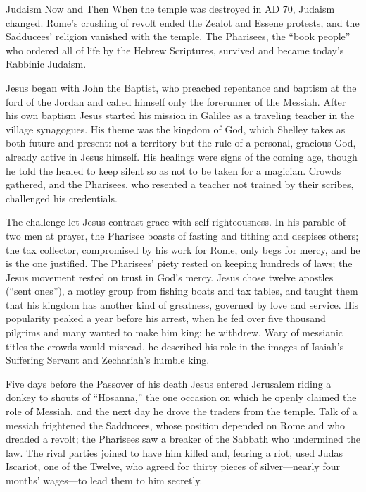 \begin{sidebox}{Judaism Now and Then}
When the temple was destroyed in AD 70, Judaism changed. Rome's crushing of revolt ended the Zealot and
Essene protests, and the Sadducees' religion vanished with the temple. The Pharisees, the ``book
people'' who ordered all of life by the Hebrew Scriptures, survived and became today's Rabbinic Judaism.
\end{sidebox}

Jesus began with John the Baptist, who preached repentance and baptism at the ford of the Jordan and
called himself only the forerunner of the Messiah. After his own baptism Jesus started his mission in
Galilee as a traveling teacher in the village synagogues. His theme was the kingdom of God, which
Shelley takes as both future and present: not a territory but the rule of a personal, gracious God,
already active in Jesus himself. His healings were signs of the coming age, though he told the healed
to keep silent so as not to be taken for a magician. Crowds gathered, and the Pharisees, who resented a
teacher not trained by their scribes, challenged his credentials.

The challenge let Jesus contrast grace with self-righteousness. In his parable of two men at prayer,
the Pharisee boasts of fasting and tithing and despises others; the tax collector, compromised by his
work for Rome, only begs for mercy, and he is the one justified. The Pharisees' piety rested on keeping
hundreds of laws; the Jesus movement rested on trust in God's mercy. Jesus chose twelve apostles
(``sent ones''), a motley group from fishing boats and tax tables, and taught them that his kingdom
has another kind of greatness, governed by love and service. His popularity peaked a year before his
arrest, when he fed over five thousand pilgrims and many wanted to make him king; he withdrew. Wary of
messianic titles the crowds would misread, he described his role in the images of Isaiah's Suffering
Servant and Zechariah's humble king.

Five days before the Passover of his death Jesus entered Jerusalem riding a donkey to shouts of ``Hosanna,''
the one occasion on which he openly claimed the role of Messiah, and the next day he drove the traders
from the temple. Talk of a messiah frightened the Sadducees, whose position depended on Rome and who
dreaded a revolt; the Pharisees saw a breaker of the Sabbath who undermined the law. The rival parties
joined to have him killed and, fearing a riot, used Judas Iscariot, one of the Twelve, who agreed for
thirty pieces of silver---nearly four months' wages---to lead them to him secretly.

